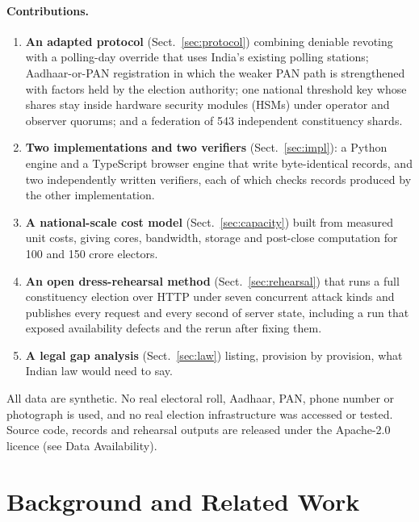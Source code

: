 \documentclass[runningheads]{llncs}
\begin{document}
\paragraph{Contributions.}
\begin{enumerate}
\item \textbf{An adapted protocol} (Sect.~\ref{sec:protocol}) combining deniable revoting with a polling-day override that uses India's existing polling stations; Aadhaar-or-PAN registration in which the weaker PAN path is strengthened with factors held by the election authority; one national threshold key whose shares stay inside hardware security modules (HSMs) under operator and observer quorums; and a federation of 543 independent constituency shards.
\item \textbf{Two implementations and two verifiers} (Sect.~\ref{sec:impl}): a Python engine and a TypeScript browser engine that write byte-identical records, and two independently written verifiers, each of which checks records produced by the other implementation.
\item \textbf{A national-scale cost model} (Sect.~\ref{sec:capacity}) built from measured unit costs, giving cores, bandwidth, storage and post-close computation for 100 and 150 crore electors.
\item \textbf{An open dress-rehearsal method} (Sect.~\ref{sec:rehearsal}) that runs a full constituency election over HTTP under seven concurrent attack kinds and publishes every request and every second of server state, including a run that exposed availability defects and the rerun after fixing them.
\item \textbf{A legal gap analysis} (Sect.~\ref{sec:law}) listing, provision by provision, what Indian law would need to say.
\end{enumerate}

All data are synthetic. No real electoral roll, Aadhaar, PAN, phone number or photograph is used, and no real election infrastructure was accessed or tested. Source code, records and rehearsal outputs are released under the Apache-2.0 licence (see Data Availability).

\section{Background and Related Work}\label{sec:related}
\end{document}
